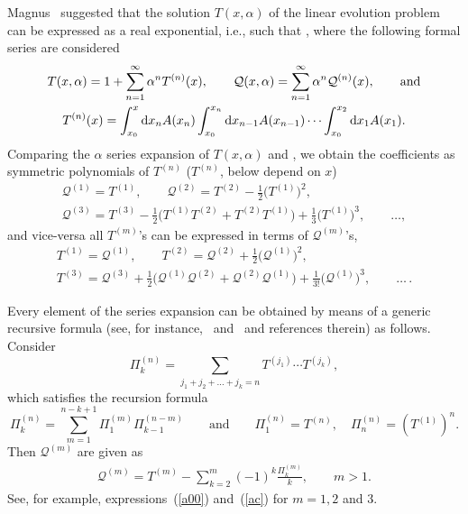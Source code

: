 \documentclass[pdftex]{sigma}
\numberwithin{equation}{section}
\theoremstyle{definition}
\begin{document}
Magnus~\cite{Magnus} suggested that the solution $T(x, \alpha)$ of the linear evolution problem can
be expressed as a real exponential, i.e.,  such that
,
where the following formal series are considered
\begin{gather*}
T(x, \alpha) = 1+ \sum_{n =1}^{\infty} \alpha^n T^{(n)}(x), \qquad
{\mathcal Q}(x, \alpha) = \sum_{n=1}^{\infty}\alpha^n {\mathcal Q}^{(n)}(x), \qquad \text{and}
\\
T^{(n)}(x) = \int_{x_0}^x {\rm d}x_n A(x_n)
\int_{x_0}^{x_n }{\rm d}x_{n-1}A(x_{n-1}) \cdots \int_{x_0}^{x_2} {\rm d}x_{1} A(x_{1}). %
\end{gather*}
Comparing the $\alpha$ series expansion of $T(x, \alpha)$ and , we obtain the coefficients
 as symmetric polynomials of $T^{(n)}$ ($T^{(n)}$,  below depend on $x$)
\begin{gather}
 {\mathcal Q}^{(1)} = T^{(1)}, \qquad {\mathcal Q}^{(2)} = T^{(2)} -\frac{1}{2} \bigl(T^{(1)}\bigr)^2,\label{a00} \\
 {\mathcal Q}^{(3)} = T^{(3)} - \frac{1} {2} \bigl( T^{(1)} T^{(2)} + T^{(2)} T^{(1)}\bigr) +\frac{1}{3} \bigl(T^{(1)}\bigr)^3, \qquad\dots, \label{ac}
\end{gather}
and {vice-versa} all $T^{(m)}$'s can be expressed in terms of ${\mathcal Q}^{(m)}$'s,
\begin{gather}
T^{(1)} = {\mathcal Q}^{(1)} , \qquad T^{(2)} = {\mathcal Q}^{(2)} + \frac{1}{2} \bigl({\mathcal Q}^{(1)}\bigr)^2, \label{a}\\
T^{(3)} = {\mathcal Q}^{(3)} + \frac{1}{2} \bigl( {\mathcal Q}^{(1)} {\mathcal Q}^{(2)} +
 {\mathcal Q}^{(2)} {\mathcal Q}^{(1)}\bigr) +\frac{1}{3!} \bigl({\mathcal Q}^{(1)}\bigr)^3, \qquad \dots\,. \label{c}
\end{gather}

Every element  of the series expansion can be obtained
by means of a generic recursive formula (see, for instance,~\cite{Bur, Sal} and~\cite{review} and references therein) as follows.
Consider
\[
\Pi^{(n)}_k = \sum_{j_1+ j_2 + \dots+ j_k =n} T^{(j_1)} \cdots T^{(j_k)},
\]
which satisfies the recursion formula
\begin{equation}
\Pi^{(n)}_k = \sum_{m=1}^{n-k+1} \Pi^{(m)}_1 \Pi^{(n-m)}_{k-1} \qquad \mbox{and} \qquad
\Pi^{(n)}_1 = T^{(n)}, \quad \Pi^{(n)}_n = (T^{(1)})^n. \label{R2}
\end{equation}
Then ${\mathcal Q}^{(m)}$ are given as
\begin{gather}
{\mathcal Q}^{(m)} = T^{(m)} - \sum_{k=2}^m (-1)^k \frac{\Pi^{(m)}_k}{k}, \qquad m>1. \label{R1}
\end{gather}
See, for example, expressions~(\ref{a00}) and~(\ref{ac}) for $m=1, 2$ and $3$.
\end{document}
